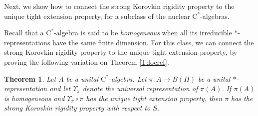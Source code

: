 \documentclass[10pt]{amsart}
\newcommand{\rC}{\mathrm{C}}
\newtheorem{theorem}[lemma]{Theorem}
\theoremstyle{definition}
\begin{document}
Next, we show how to connect the strong Korovkin rigidity property to the unique tight extension property, for a subclass of the nuclear $\rC^*$-algebras. 


Recall that a $\rC^*$-algebra is said to be \emph{homogeneous} when all its irreducible $*$-representations have the same finite dimension. For this class, we can connect the strong Korovkin rigidity property to the unique tight extension property, by proving the following variation on Theorem \ref{T:locref}.



\begin{theorem}\label{T:normhomo}
Let $A$ be a unital  $\rC^*$-algebra. Let $\pi:A\to B(H)$ be a unital $*$-representation and let $\Upsilon_\pi$ denote the universal representation of $\pi(A)$. If $\pi(A)$ is homogeneous and $\Upsilon_\pi\circ \pi$ has the unique tight extension property, then $\pi$ has the strong Korovkin rigidity property with respect to $S$.
\end{theorem}
\end{document}
